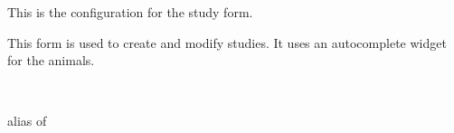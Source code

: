 \documentclass[letterpaper,10pt,english]{sphinxmanual}
\begin{document}
\begin{fulllineitems}
\label{api:data.forms.StudyForm}
This is the configuration for the study form.

This form is used to create and modify studies.  It uses an autocomplete widget for the animals.

\begin{fulllineitems}
\label{api:data.forms.StudyForm.Media}
\end{fulllineitems}


\begin{fulllineitems}
\label{api:data.forms.StudyForm.Meta}~

\begin{fulllineitems}
\label{api:data.forms.StudyForm.Meta.model}
alias of 

\end{fulllineitems}


\end{fulllineitems}


\begin{fulllineitems}
\label{api:data.forms.StudyForm.media}
\end{fulllineitems}


\end{fulllineitems}

\end{document}
